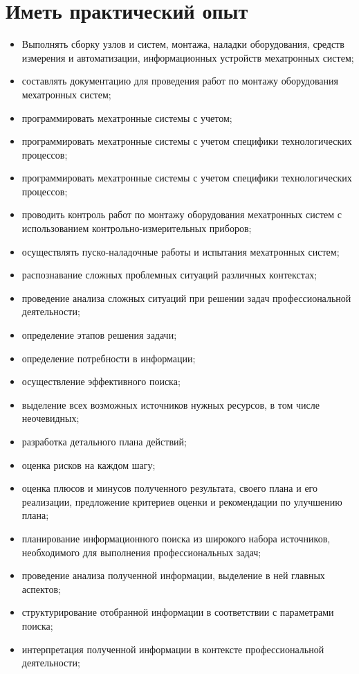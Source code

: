 \section*{Иметь практический опыт}
\begin{itemize}
\item Выполнять сборку узлов и систем, монтажа, наладки оборудования, средств измерения и автоматизации, информационных устройств мехатронных систем;
\item составлять документацию для проведения работ по монтажу оборудования мехатронных систем;
\item программировать мехатронные системы с учетом;
\item программировать мехатронные системы с учетом специфики технологических процессов;
\item программировать мехатронные системы с учетом специфики технологических процессов;
\item проводить контроль работ по монтажу оборудования мехатронных систем с использованием контрольно-измерительных приборов;
\item осуществлять пуско-наладочные работы и испытания мехатронных систем;
\item распознавание сложных проблемных ситуаций различных контекстах;
\item проведение анализа сложных ситуаций при решении задач профессиональной деятельности;
\item определение этапов решения задачи;
\item определение потребности в информации;
\item осуществление эффективного поиска;
\item выделение всех возможных источников нужных ресурсов, в том числе неочевидных;
\item разработка детального плана действий;
\item оценка рисков на каждом шагу;
\item оценка плюсов и минусов полученного результата, своего плана и его реализации, предложение критериев оценки и рекомендации по улучшению плана;
\item планирование информационного поиска из широкого набора источников, необходимого для выполнения профессиональных задач;
\item проведение анализа полученной информации, выделение в ней главных аспектов;
\item структурирование отобранной информации в соответствии с параметрами поиска;
\item интерпретация полученной информации в контексте профессиональной деятельности;

\end{itemize}
